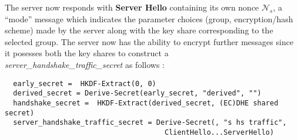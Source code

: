 The server now responds with \textbf{Server Hello} containing its own nonce $\mathcal{N}_s$, a ``mode'' message which
indicates the parameter choices (group, encryption/hash scheme) made by the server along with the key share corresponding to the selected group. The server now has the ability to encrypt further messages since it posesses both the key shares to construct a \\ \textit{server\_handshake\_traffic\_secret} as follows \cite{rfc8446}:
  \begin{verbatim}
  early_secret =  HKDF-Extract(0, 0)
  derived_secret = Derive-Secret(early_secret, "derived", "")
  handshake_secret =  HKDF-Extract(derived_secret, (EC)DHE shared secret)
  server_handshake_traffic_secret = Derive-Secret(, "s hs traffic", 
                                      ClientHello...ServerHello)
  \end{verbatim}

